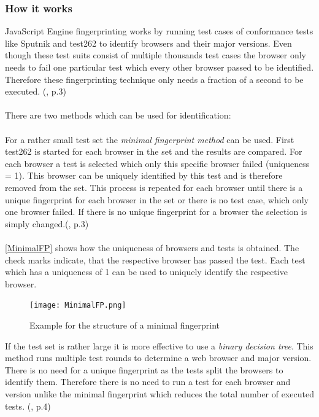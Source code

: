 \subsubsection{How it works}
JavaScript Engine fingerprinting works by running test cases of conformance tests like Sputnik and test262 to identify browsers and their major versions. Even though these test suits consist of multiple thousands test cases the browser only needs to fail one particular test which every other browser passed to be identified. Therefore these fingerprinting technique only needs a fraction of a second to be executed. (\textcite{mulazzani13}, p.3) \\\\
There are two methods which can be used for identification:\\\\
For a rather small test set the \textit{minimal fingerprint method} can be used. First test262 is started for each browser in the set and the results are compared. For each browser a test is selected which only this specific browser failed (uniqueness = 1). This browser can be uniquely identified by this test and is therefore removed from the set. This process is repeated for each browser until there is a unique fingerprint for each browser in the set or there is no test case, which only one browser failed. If there is no unique fingerprint for a browser the selection is simply changed.(\textcite{mulazzani13}, p.3)\\\\
\autoref{MinimalFP} shows how the uniqueness of browsers and tests is obtained. The check marks indicate, that the respective browser has passed the test. Each test which has a uniqueness of 1 can be used to uniquely identify the respective browser.
\begin{figure}[H]
	\centering
	\texttt{[image: MinimalFP.png]}
	\caption{Example for the structure of a minimal fingerprint\\}
	\label{MinimalFP}
\end{figure}
If the test set is rather large it is more effective to use a \textit{binary decision tree}. This method runs multiple test rounds to determine a web browser and major version. There is no need for a unique fingerprint as the tests split the browsers to identify them. Therefore there is no need to run a test for each browser and version unlike the minimal fingerprint which reduces the total number of executed tests. (\textcite{mulazzani13}, p.4)\\\\
